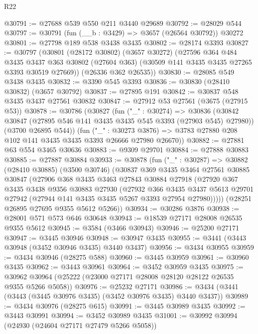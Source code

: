 \begin{lexlean}{R22}
\begin{coremodule}
@30791 := @27688 @539 @550 @211 @3440 @29689
@30792 := @28029 @544
@30797 := @30791 (fun (__b : @3429) => @3657 (@26564 @30792)) @30272
@30801 := @27798 @189 @538 @3438 @3435
@30802 := @28174 @3393
@30827 := @30797
    (@30801
      (@28172 @30802)
      (@3657 @30272)
      (@27596
        @364
        @484
        @3435
        @3437
        @363
        @30802
        (@27604 @363)
        (@30509 @141 @3435 @3435 @27265 @3393 @30519 @27669))
      (@26336 @362 @26535))
@30830 := @28085 @549 @3438 @3435
@30832 := @3390 @545 @3393
@30836 := @30830 (@28410 @30832) (@3657 @30792)
@30837 := @27895 @191
@30842 := @30837 @548 @3435 @3437 @27561 @30832
@30847 := @27912 @53 @27561 (@3675 (@27915 @53))
@30878 := @30786
    (@30827
      (fun ("_" : @30274) =>
      @30836
        (@30842 @30847 (@27895 @546 @141 @3435 @3435 @545 @3393 (@27903 @545) @27980))
        (@3700 @26895 @544))
      (fun ("_" : @30273 @3876) =>
      @3783 @27880 @208 @102 @141 @3435 @3435 @3393 @26666 @27980 @26670))
@30882 := @27881 @63 @554 @3465 @30636
@30883 := @9309 @29701
@30884 := @27888 @30883
@30885 := @27887 @30884
@30933 := @30878
    (fun ("_" : @30287) =>
    @30882
      (@28410 @30885)
      (@3500 @30746)
      (@30837
        @369
        @3435
        @3464
        @27561
        @30885
        @30847
        (@27906
          @368
          @3435
          @3463
          @27843
          @30884
          @27918
          (@27920
            @367
            @3435
            @3438
            @9356
            @30883
            @27930
            (@27932
              @366
              @3435
              @3437
              @5613
              @29701
              @27942
              (@27944 @141 @3435 @3435 @5267 @3393 @27954 @27980)))))
      (@28251 @26895 @27695 @9355 @5612 @5266))
@30934 := @30286 @3876
@30938 := @28001 @571 @573 @646 @30648
@30943 := @18539 @27171 @28008 @26535 @9355 @5612
@30945 := @3584 (@3466 @30943)
@30946 := @25200 @27171
@30947 := @3445 @30946
@30948 := @30947 @3435
@30955 := @3441 (@3443 @30948 (@3452 @30946 @3435) @3440 @3437)
@30956 := @3434 @30955
@30959 := @3434 @30946 (@28275 @588)
@30960 := @3445 @30959
@30961 := @30960 @3435
@30962 := @3443 @30961
@30964 := @3452 @30959 @3435
@30975 := @30962 @30964 (@25222 (@23000 @27171 @28008 @28120 @28122 @26535 @9355 @5266 @5058))
@30976 := @25232 @27171
@30986 := @3434 (@3441 (@3443 (@3445 @30976 @3435) (@3452 @30976 @3435) @3440 @3437))
@30989 := @3434 @30976 (@28275 @615)
@30991 := @3445 @30989 @3435
@30992 := @3443 @30991
@30994 := @3452 @30989 @3435
@31001 := @30992 @30994 (@24930 (@24604 @27171 @27479 @5266 @5058))

\end{coremodule}
\end{lexlean}
